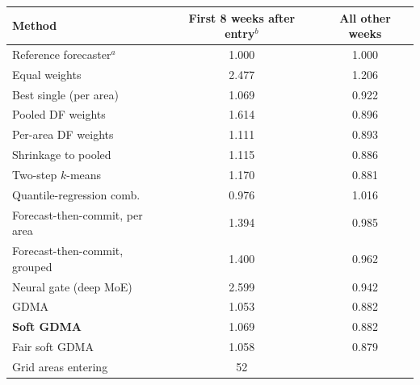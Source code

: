 \begin{tabular}{@{}lcc@{}}
\toprule
Method & First 8 weeks after entry$^b$ & All other weeks \\
\midrule
Reference forecaster$^a$ & 1.000 & 1.000 \\
Equal weights & 2.477 & 1.206 \\
Best single (per area) & 1.069 & 0.922 \\
Pooled DF weights & 1.614 & 0.896 \\
Per-area DF weights & 1.111 & 0.893 \\
Shrinkage to pooled & 1.115 & 0.886 \\
Two-step $k$-means & 1.170 & 0.881 \\
Quantile-regression comb. & 0.976 & 1.016 \\
Forecast-then-commit, per area & 1.394 & 0.985 \\
Forecast-then-commit, grouped & 1.400 & 0.962 \\
Neural gate (deep MoE) & 2.599 & 0.942 \\
GDMA & 1.053 & 0.882 \\
\textbf{Soft GDMA} & 1.069 & 0.882 \\
Fair soft GDMA & 1.058 & 0.879 \\
\midrule
Grid areas entering & 52 & \\
\bottomrule
\end{tabular}